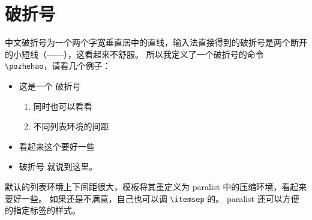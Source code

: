 \section{破折号}
\label{sec:pozhehao}

中文破折号为一个两个字宽垂直居中的直线，输入法直接得到的破折号是两个断开的小短线（——），这看起来不舒服。
所以我定义了一个破折号的命令 \verb|\pozhehao|，请看几个例子：
\begin{itemize}
  \item 这是一个 \pozhehao 破折号
        \begin{enumerate}[(1)]
          \item 同时也可以看看
          \item 不同列表环境的间距
        \end{enumerate}
  \item 看起来这个要好一些
  \item 破折号 \pozhehao 就说到这里。
\end{itemize}

默认的列表环境上下间距很大，模板将其重定义为 \textsf{paralist} 中的压缩环境，看起来要好一些。
如果还是不满意，自己也可以调 \verb|\itemsep| 的。
\textsf{paralist} 还可以方便的指定标签的样式。


